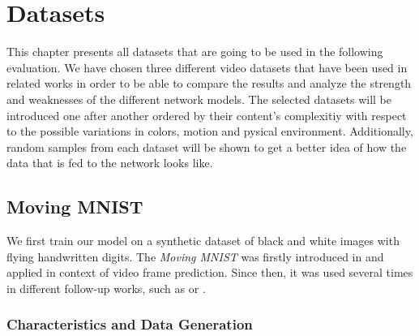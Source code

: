 
\chapter{Datasets} \label{chapter:datasets}

This chapter presents all datasets that are going to be used in the following evaluation. We have chosen three different video datasets that have been used in related works in order to be able to compare the results and analyze the strength and weaknesses of the different network models. The selected datasets will be introduced one after another ordered by their content's complexitiy with respect to the possible variations in colors, motion and pysical environment. Additionally, random samples from each dataset will be shown to get a better idea of how the data that is fed to the network looks like.


\section{Moving MNIST} \label{sec:ds_mm}


We first train our model on a synthetic dataset of black and white images with flying handwritten digits. The \textit{Moving MNIST} was firstly introduced in \parencite{unsup_learn_lstm} and applied in context of video frame prediction. Since then, it was used several times in different follow-up works, such as \parencite{spat_temp_video_autoenc} or \parencite{conv_lstm_nowcasting}. 

\subsection{Characteristics and Data Generation}

